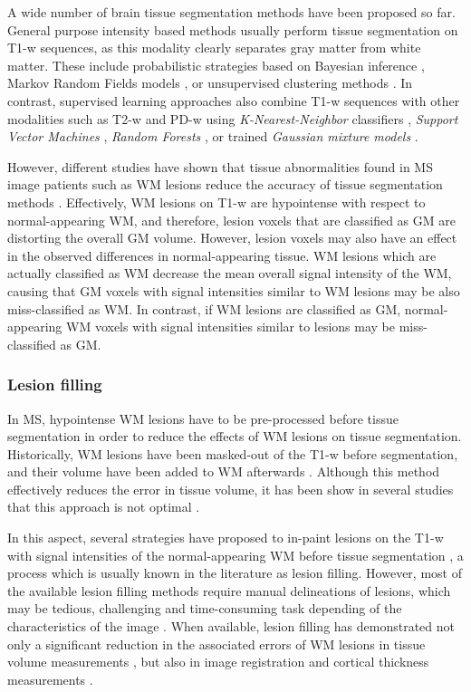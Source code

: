 A wide number of brain tissue segmentation methods have been proposed so far. General purpose intensity based methods usually perform tissue segmentation on T1-w sequences, as this modality clearly separates gray matter from white matter. These include probabilistic strategies based on Bayesian inference \cite{Ashburner2005,Marroquin2002, Roy2012,Shattuck2001}, Markov Random Fields models \cite{Bricq2008, Tohka2010, Zhang2001}, or unsupervised clustering methods \cite{Caldairou2011, Pham2001}. In contrast, supervised learning approaches also combine T1-w sequences with other modalities such as T2-w and PD-w using \textit{K-Nearest-Neighbor} classifiers \cite{deBoer2009,Vrooman2013}, \textit{Support Vector Machines} \cite{Akselrod2006,Opbroek2013}, \textit{Random Forests} \cite{yi2009,Mahapatra2014}, or trained \textit{Gaussian mixture models} \cite{Rajchl2015}. 

However, different studies have shown that tissue abnormalities found in MS image patients such as WM lesions reduce the accuracy of tissue segmentation methods \cite{Battaglini2012, Chard2010}. Effectively, WM lesions on T1-w are hypointense with respect to normal-appearing WM, and  therefore, lesion voxels that are classified as GM are distorting the overall GM volume. However, lesion voxels may also have an effect in the observed differences in normal-appearing tissue. WM lesions which are actually classified as WM decrease the mean overall signal intensity of the WM, causing that GM voxels with signal intensities similar to WM lesions may be also miss-classified as WM.  In contrast, if WM lesions are classified as GM, normal-appearing WM voxels with signal intensities similar to lesions may be miss-classified as GM. 
 
\subsubsection{Lesion filling}
\label{subsec:lesion_filling}
In MS, hypointense WM lesions have to be pre-processed before tissue segmentation in order to reduce the effects of WM lesions on tissue segmentation. Historically, WM lesions have been masked-out of the T1-w before segmentation, and their volume have been added to WM afterwards \cite{Chard2002}. Although this method effectively reduces the error in tissue volume, it has been show in several studies that this approach is not optimal \cite{Battaglini2012, Chard2010}. 

In this aspect, several strategies have proposed to in-paint lesions on the T1-w with signal intensities of the normal-appearing WM before tissue segmentation \cite{Battaglini2012, Chard2010, Magon2014, Sdika2009}, a process which is usually known in the literature as lesion filling. However, most of the available lesion filling methods require manual delineations of lesions, which may be tedious, challenging and time-consuming task depending of the characteristics of the image \cite{Llado2012}. When available, lesion filling has demonstrated not only a significant reduction in the associated errors of WM lesions in tissue volume measurements \cite{Popescu2014}, but also in image registration \cite{Ceccarelli2012,  Diez2014, Sdika2009} and cortical thickness measurements \cite{Magon2014}. 


